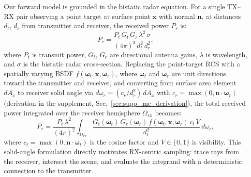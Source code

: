 Our forward model is grounded in the bistatic radar equation. For a single TX--RX pair observing a point target at surface point $\mathbf{x}$ with normal $\mathbf{n}$, at distances $d_t$, $d_r$ from transmitter and receiver, the received power $P_r$ is:
\begin{equation}
    P_r
    =
    \frac{P_t\, G_t\, G_r\, \lambda^2\, \sigma}{(4\pi)^3\, d_t^2\, d_r^2},
    \label{eq:radar_bistatic}
\end{equation}
where $P_t$ is transmit power, $G_t$, $G_r$ are directional antenna gains, $\lambda$ is wavelength, and $\sigma$ is the bistatic radar cross-section. Replacing the point-target RCS with a spatially varying BSDF $f(\boldsymbol{\omega}_t, \mathbf{x}, \boldsymbol{\omega}_r)$, where $\boldsymbol{\omega}_t$ and $\boldsymbol{\omega}_r$ are unit directions toward the transmitter and receiver, and converting from surface area element $dA_x$ to receiver solid angle via $d\omega_r = (c_r / d_r^2)\,dA_x$ with $c_r = \max(0, \mathbf{n} \cdot \boldsymbol{\omega}_r)$ (derivation in the supplement, Sec.~\ref{sec:supp_mc_derivation}), the total received power integrated over the receiver hemisphere $\Omega_{rx}$ becomes:
\begin{equation}
    P_r
    =
    \frac{P_t\,\lambda^2}{(4\pi)^2}
    \int_{\Omega_{rx}}
    \frac{
    G_t(\boldsymbol{\omega}_t)\,G_r(\boldsymbol{\omega}_r)\,
    f(\boldsymbol{\omega}_t, \mathbf{x}, \boldsymbol{\omega}_r)\,
    c_t\, V
    }{
    d_t^2
    }
    \, d\omega_r,
    \label{eq:radar_solid_angle}
\end{equation}
where $c_t = \max(0, \mathbf{n} \cdot \boldsymbol{\omega}_t)$ is the cosine factor and $V \in \{0,1\}$ is visibility. This solid-angle formulation directly motivates RX-centric sampling: trace rays from the receiver, intersect the scene, and evaluate the integrand with a deterministic connection to the transmitter.

